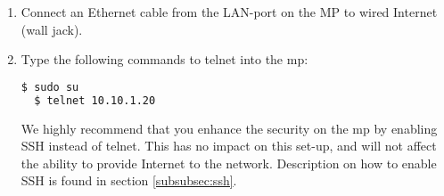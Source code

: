\begin{enumerate}
\begin{enumerate}
\item In the field BSSID enter "02:CA:FF:EE:BA:BE", like shown in .
\item Under the tab "IPv4 Settings" choose "Manual" under the Method drop-down menu, like shown in . 
\item Then press "Add" on the same page. Enter the following parameters, like shown in :
\begin{description}
\item[] \textbf{Address:} 10.10.1.245
\item[] \textbf{Netmask:} 24
\item[] \textbf{Gateway:} 10.130.1.1
\end{description}
\begin{figure}[h!]
        \centering
        \begin{subfigure}[t]{0.49\textwidth}
                \texttt{[image: bssid.PNG]}
                \caption{\textbf{The correct BSSID set.}}\label{fig:bssid}
        \end{subfigure}
        \begin{subfigure}[t]{0.49\textwidth}
                \texttt{[image: ipv4settings.PNG]}
                \caption{\textbf{The correct parameters set under IPv4 settings.}}\label{fig:ipv4settings}
        \end{subfigure}
\caption{"Edit Connections" settings on Linux}
\end{figure}
\item Press "Save" on the "Editing vt-mesh"-window, and then "Close" on the "Network Connections"-window. 
\item Then choose "vt-mesh" from the list of available networks. This list is found after pressing the WiFi symbol in the top right corner on your screen. The PC should then be connected to the MP via WiFi. 
\end{enumerate}
\item Connect an Ethernet cable from the LAN-port on the MP to wired Internet (wall jack).
\item Type the following commands to telnet into the \gls{mp}:
\noindent
\begin{lstlisting}[language=bash]
  $ sudo su
  $ telnet 10.10.1.20
\end{lstlisting}
We highly recommend that you enhance the security on the \gls{mp} by enabling SSH instead of telnet. This has no impact on this set-up, and will not affect the ability to provide Internet to the network. Description on how to enable SSH is found in section \ref{subsubsec:ssh}.

\end{enumerate}

